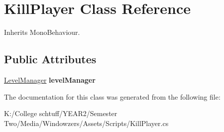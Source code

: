 \hypertarget{class_kill_player}{}\section{Kill\+Player Class Reference}
\label{class_kill_player}


Inherits Mono\+Behaviour.

\subsection*{Public Attributes}
\begin{DoxyCompactItemize}
\item 
\mbox{\label{class_kill_player_a83b566190e0df41df7aa92ce1d512a84}} 
\hyperlink{class_level_manager}{Level\+Manager} {\bfseries level\+Manager}
\end{DoxyCompactItemize}


The documentation for this class was generated from the following file\+:\begin{DoxyCompactItemize}
\item 
K\+:/\+College schtuff/\+Y\+E\+A\+R2/\+Semester Two/\+Media/\+Windowzers/\+Assets/\+Scripts/Kill\+Player.\+cs\end{DoxyCompactItemize}
